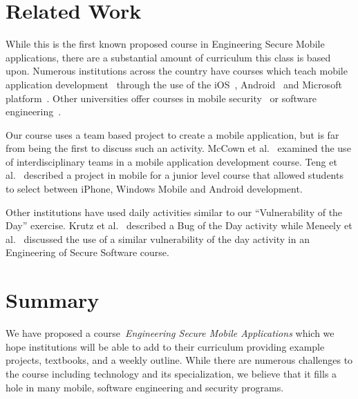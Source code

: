 \documentclass[conference]{IEEEtran}
\begin{document}
\section{Related Work}
\label{sec: relatedwork}



While this is the first known proposed course in Engineering Secure Mobile applications, there are a substantial amount of curriculum this class is based upon. Numerous institutions across the country have courses which teach mobile application development~\cite{mobiledevelop_11} through the use of the iOS~\cite{ios_develop_url}, Android~\cite{androiddevel_url} and Microsoft platform~\cite{mobileappdesign_url}. Other universities offer courses in mobile security~\cite{mobilesecurity_URL} or software engineering~\cite{rit_url}.


Our course uses a team based project to create a mobile application, but is far from being the first to discuss such an activity. McCown et al.~\cite{McCown:2013:UIT:2458569.2458588} examined the use of interdisciplinary teams in a mobile application development course. Teng et al.~\cite{5501730} described a project in mobile for a junior level course that allowed students to select between iPhone, Windows Mobile and Android development. 


Other institutions have used daily activities similar to our ``Vulnerability of the Day'' exercise. Krutz et al.~\cite{6685147} described a Bug of the Day activity while Meneely et al.~\cite{Meneely:2013:VDC:2486788.2486948} discussed the use of a similar vulnerability of the day activity in an Engineering of Secure Software course.

\section{Summary}
\label{sec: summary}

We have proposed a course~\emph{Engineering Secure Mobile Applications} which we hope institutions will be able to add to their curriculum providing example projects, textbooks, and a weekly outline. While there are numerous challenges to the course including technology and its specialization, we believe that it fills a hole in many mobile, software engineering and security programs.


\balance


\end{document}
